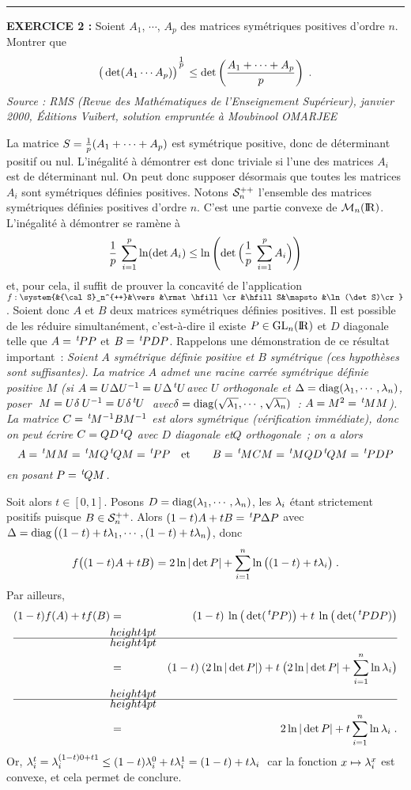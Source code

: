 \documentclass{article}
\begin{document}
\bsk
\hrule
\bsk

{\bf EXERCICE 2 :}\msk
Soient $A_1$, $\cdots$, $A_p$ des matrices sym\'etriques positives d'ordre $n$. Montrer que\vv
$$\big(\det(A_1\cdots A_p)\big)^{{}^{\sst1\sur\sst p}}\ie\det\lp{A_1+\cdots+A_p\s p}\rp\;.$$
\ssk
{\it Source : RMS (Revue des Math\'ematiques de l'Enseignement Sup\'erieur), janvier 2000, \'Editions Vuibert, solution emprunt\'ee \`a Moubinool OMARJEE}

\msk
\cl{- - - - - - - - - - - - - - - - - - - - - - - - - - - - - - - }
\msk

La matrice $S={1\over p}(A_1+\cdots+A_p)$ est sym\'etrique positive, donc de d\'eterminant positif ou nul. L'in\'egalit\'e \`a d\'emontrer est donc triviale si l'une des matrices $A_i$ est de d\'eterminant nul. On peut donc supposer d\'esormais que toutes les matrices $A_i$ sont sym\'etriques d\'efinies positives. 
\msk
Notons ${\cal S}_n^{++}$ l'ensemble des matrices sym\'etriques d\'efinies positives d'ordre $n$. C'est une partie convexe de ${\cal M}_n({\rm I\kern-0.6mm R})$. L'in\'egalit\'e \`a d\'emontrer se ram\`ene \`a\vv
$${1\over p}\>\sum_{i=1}^p\ln(\mathop{\rm det}\nolimits A_i)\leq\ln\left(\mathop{\rm det}\nolimits\Big({1\over p}\>\sum_{i=1}^p A_i\Big)\right)$$
et, pour cela, il suffit de prouver la concavit\'e de l'application $f:\system{&{\cal S}_n^{++}&\vers&\rmat\hfill\cr &\hfill S&\mapsto&\ln(\det S)\cr}$.\ssk
Soient donc $A$ et $B$ deux matrices sym\'etriques d\'efinies positives. Il est possible de les r\'eduire simultan\'ement, c'est-\`a-dire il existe $P\in{\rm GL}_n({\rm I\kern-0.6mm R})$ et $D$ diagonale telle que $A=\,{}^t\!\!\>PP$ et $B=\,{}^t\!\!\>PDP$. Rappelons une d\'emonstration de ce r\'esultat important~:\ssk\new
{\it Soient $A$ sym\'etrique d\'efinie positive et $B$ sym\'etrique (ces hypoth\`eses sont suffisantes). La matrice $A$ admet une racine carr\'ee sym\'etrique d\'efinie positive $M$ (si $A=U\Delta U^{-1}=U\Delta\,{}^t\!\!\;U$\break avec $U$ orthogonale et $\Delta=\mathop{\rm diag}\nolimits(\lambda_1,\cdots,\lambda_n)$, poser $\;M=U\delta\> U^{-1}=U\delta\,{}^t\!\!\>U\;$ avec\break $\delta=\mathop{\rm diag}\nolimits(\sqrt{\lambda_1},\cdots,\sqrt{\lambda_n})$~: $A=M^2=\,{}^t\!\!\>MM$).
 La matrice $C=\,{}^t\!\!\>M^{-1}BM^{-1}$ est alors sym\'etrique (v\'erification imm\'ediate), donc on peut \'ecrire $C=QD\,{}^t\!\!\;Q$ avec $D$ diagonale et\break $Q$ orthogonale~; on a alors\vvv 
$$A=\t\>MM=\t\>MQ\t\>QM=\t\>PP\quad{\rm et}\qquad B=\t\>MCM=\t\>MQD\t\>QM=\t\>PDP$$
en posant $P=\,{}^t\!\!\>QM$.}

\msk
Soit alors $t\in[0,1]$. Posons $D=\mathop{\rm diag}\nolimits(\lambda_1,\cdots,\lambda_n)$, les $\lambda_i$ \'etant strictement positifs puisque $B\in{\cal S}_n^{++}$. Alors $(1-t)A+tB=\,{}^t\!\!\>P\Delta P$ avec $\Delta=\mathop{\rm diag}\nolimits\big((1-t)+t\lambda_1,\cdots,(1-t)+t\lambda_n\big)$, donc\vvvv
$$f\big((1-t)A+tB\big)=2\ln|\mathop{\rm det}\nolimits P|+\sum_{i=1}^n\ln\big((1-t)+t\lambda_i\big)\;.$$\vv\sect
Par ailleurs,\vvvv
\begin{eqnarray*}
(1-t)f(A)+tf(B) & = & (1-t)\>\ln\big(\det(\t\>PP)\big)+t\>\ln\big(\det(\t\>PDP)\big)\\
                     & = & (1-t)\>(2\ln|\det P|)+t\>\big(2\ln|\det P|+\sum_{i=1}^n\ln\lam_i\big)\\
                     & = & 2\ln|\det P|+t\sum_{i=1}^n\ln\lam_i\;.
\end{eqnarray*}
Or, $\lambda_i^t=\lambda_i^{(1-t)0+t1}\leq(1-t)\lambda_i^0+t\lambda_i^1=(1-t)+t\lambda_i\;$ car la fonction $x\mapsto\lambda_i^x$ est convexe, et cela permet de conclure. 
\end{document}
